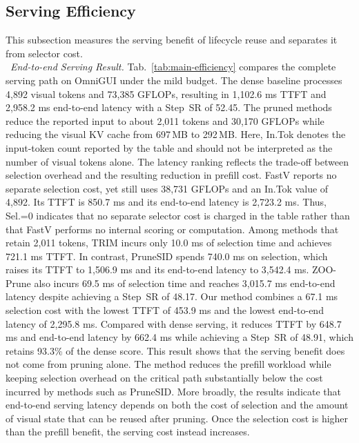 \subsection{Serving Efficiency}
\label{app:efficiency}
This subsection measures the serving benefit of lifecycle reuse and separates it from selector cost.
\\
\noindent{}~\textit{End-to-end Serving Result.}
Tab.~\ref{tab:main-efficiency} compares the complete serving path on OmniGUI under the mild budget. 
%
The dense baseline processes 4,892 visual tokens and 73,385 GFLOPs, resulting in 1,102.6 ms TTFT and 2,958.2 ms end-to-end latency with a Step~SR of 52.45.
%
The pruned methods reduce the reported input to about 2,011 tokens and 30,170 GFLOPs while reducing the visual KV cache from 697\,MB to 292\,MB. 
%
Here, In.Tok denotes the input-token count reported by the table and should not be interpreted as the number of visual tokens alone.
%
The latency ranking reflects the trade-off between selection overhead and the resulting reduction in prefill cost. FastV reports no separate selection cost, yet still uses 38,731 GFLOPs and an In.Tok value of 4,892. 
%
Its TTFT is 850.7 ms and its end-to-end latency is 2,723.2 ms. Thus, Sel.=0 indicates that no separate selector cost is charged in the table rather than that FastV performs no internal scoring or computation. Among methods that retain 2,011 tokens, TRIM incurs only 10.0 ms of selection time and achieves 721.1 ms TTFT. In contrast, PruneSID spends 740.0 ms on selection, which raises its TTFT to 1,506.9 ms and its end-to-end latency to 3,542.4 ms. ZOO-Prune also incurs 69.5 ms of selection time and reaches 3,015.7 ms end-to-end latency despite achieving a Step~SR of 48.17.
%
Our method combines a 67.1 ms selection cost with the lowest TTFT of 453.9 ms and the lowest end-to-end latency of 2,295.8 ms. Compared with dense serving, it reduces TTFT by 648.7 ms and end-to-end latency by 662.4 ms while achieving a Step~SR of 48.91, which retains 93.3\% of the dense score. 
%
This result shows that the serving benefit does not come from pruning alone. 
%
The method reduces the prefill workload while keeping selection overhead on the critical path substantially below the cost incurred by methods such as PruneSID. 
%
More broadly, the results indicate that end-to-end serving latency depends on both the cost of selection and the amount of visual state that can be reused after pruning.
%
Once the selection cost is higher than the prefill benefit, the serving cost instead increases.

\\
